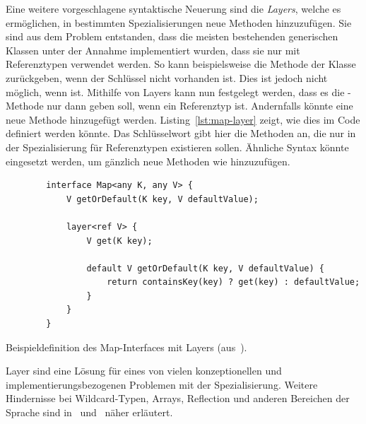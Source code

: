 Eine weitere vorgeschlagene syntaktische Neuerung sind die \emph{Layers}, welche es ermöglichen, in bestimmten Spezialisierungen neue Methoden hinzuzufügen.
Sie sind aus dem Problem entstanden, dass die meisten bestehenden generischen Klassen unter der Annahme implementiert wurden, dass sie nur mit Referenztypen verwendet werden.
So kann beispielsweise die Methode  der Klasse   zurückgeben, wenn der Schlüssel nicht vorhanden ist.
Dies ist jedoch nicht möglich, wenn  ist.
Mithilfe von Layers kann nun festgelegt werden, dass es die -Methode nur dann geben soll, wenn  ein Referenztyp ist.
Andernfalls könnte eine neue Methode  hinzugefügt werden.
Listing~\ref{lst:map-layer} zeigt, wie dies im Code definiert werden könnte.
Das Schlüsselwort  gibt hier die Methoden an, die nur in der Spezialisierung für Referenztypen  existieren sollen.
Ähnliche Syntax könnte eingesetzt werden, um gänzlich neue Methoden wie  hinzuzufügen.

\begin{listing}
    \begin{verbatim}
        interface Map<any K, any V> {
            V getOrDefault(K key, V defaultValue);

            layer<ref V> {
                V get(K key);

                default V getOrDefault(K key, V defaultValue) {
                    return containsKey(key) ? get(key) : defaultValue;
                }
            }
        }
    \end{verbatim}
    \vspace{-3ex}
    \caption{Beispieldefinition des Map-Interfaces mit Layers (aus~\cite{specialization}).}
    \label{lst:map-layer}
\end{listing}

Layer sind eine Lösung für eines von vielen konzeptionellen und implementierungsbezogenen Problemen mit der Spezialisierung.
Weitere Hindernisse bei Wildcard-Typen, Arrays, Reflection und anderen Bereichen der Sprache sind in~\cite{jep-218} und~\cite{specialization} näher erläutert.
